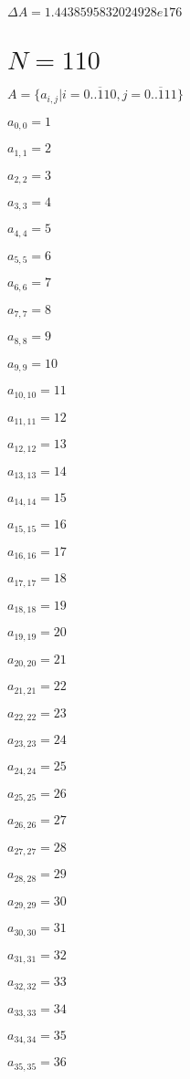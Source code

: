 \documentclass[a4paper,12pt]{article}
\begin{document}
$\Delta A = 1.4438595832024928e176$



\section{ $N = 110$ }
$A = \{ a _{ i, j } | i = \overline { 0..110 }, j = \overline { 0..111 } \}$

$a _{ 0, 0 } = 1$

$a _{ 1, 1 } = 2$

$a _{ 2, 2 } = 3$

$a _{ 3, 3 } = 4$

$a _{ 4, 4 } = 5$

$a _{ 5, 5 } = 6$

$a _{ 6, 6 } = 7$

$a _{ 7, 7 } = 8$

$a _{ 8, 8 } = 9$

$a _{ 9, 9 } = 10$

$a _{ 10, 10 } = 11$

$a _{ 11, 11 } = 12$

$a _{ 12, 12 } = 13$

$a _{ 13, 13 } = 14$

$a _{ 14, 14 } = 15$

$a _{ 15, 15 } = 16$

$a _{ 16, 16 } = 17$

$a _{ 17, 17 } = 18$

$a _{ 18, 18 } = 19$

$a _{ 19, 19 } = 20$

$a _{ 20, 20 } = 21$

$a _{ 21, 21 } = 22$

$a _{ 22, 22 } = 23$

$a _{ 23, 23 } = 24$

$a _{ 24, 24 } = 25$

$a _{ 25, 25 } = 26$

$a _{ 26, 26 } = 27$

$a _{ 27, 27 } = 28$

$a _{ 28, 28 } = 29$

$a _{ 29, 29 } = 30$

$a _{ 30, 30 } = 31$

$a _{ 31, 31 } = 32$

$a _{ 32, 32 } = 33$

$a _{ 33, 33 } = 34$

$a _{ 34, 34 } = 35$

$a _{ 35, 35 } = 36$
\end{document}
